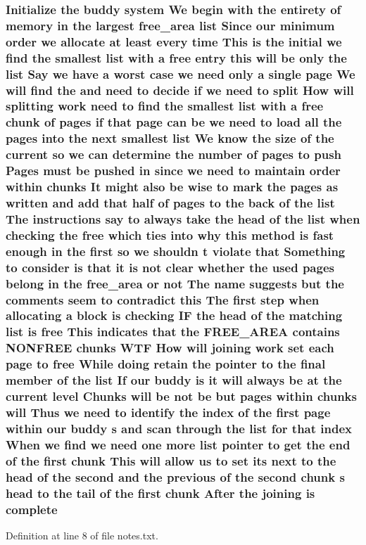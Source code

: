 \subsubsection[{\texorpdfstring{complete}{complete}}]{\setlength{\rightskip}{0pt plus 5cm}Initialize the buddy system We begin with the entirety of memory {\bf in} the largest {\bf free\+\_\+area} {\bf list} Since our minimum {\bf order} we allocate at least every time This {\bf is} the initial we find the smallest {\bf list} with a free entry this will be only the {\bf list} Say we have a worst case we need only a single {\bf page} We will find the and need to decide if we need to {\bf split} How will splitting work need to find the smallest {\bf list} with a free {\bf chunk} of {\bf pages} if that {\bf page} can be we need to load all the {\bf pages} into the next smallest {\bf list} We know the size of the current {\bf so} we can determine the number of {\bf pages} to push Pages must be pushed {\bf in} since we need to maintain {\bf order} within chunks It might also be wise to mark the {\bf pages} as written and add that half of {\bf pages} to the back of the {\bf list} The instructions say to always take the head of the {\bf list} when checking the free which ties into why this method {\bf is} fast enough {\bf in} the {\bf first} {\bf so} we shouldn t violate that Something to consider {\bf is} that {\bf it} {\bf is} {\bf not} clear whether the used {\bf pages} belong {\bf in} the {\bf free\+\_\+area} or {\bf not} The name suggests but the comments seem to contradict this The {\bf first} step when allocating a block {\bf is} checking IF the head of the matching {\bf list} {\bf is} free This indicates that the F\+R\+E\+E\+\_\+\+A\+R\+EA contains N\+O\+N\+F\+R\+EE chunks W\+TF How will joining work set each {\bf page} to free While doing retain the pointer to the final member of the {\bf list} If our buddy {\bf is} {\bf it} will always be at the current level Chunks will be {\bf not} be but {\bf pages} within chunks will Thus we need to identify the index of the {\bf first} {\bf page} within our buddy s and scan through the {\bf list} for that index When we find we need one more {\bf list} pointer to get the end of the {\bf first} {\bf chunk} This will allow us to set its next to the head of the second and the previous of the second {\bf chunk} s head to the tail of the {\bf first} {\bf chunk} After the joining {\bf is} complete}\hypertarget{notes_8txt_a567dce96449c045c4c1d67230c092e31}{}\label{notes_8txt_a567dce96449c045c4c1d67230c092e31}


Definition at line 8 of file notes.\+txt.

